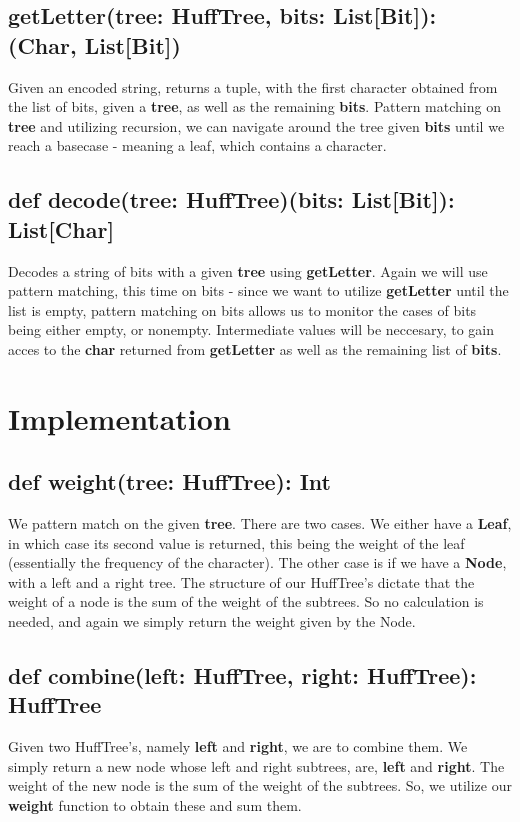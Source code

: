 \documentclass{article}
\begin{document}
\subsection{getLetter(tree: HuffTree, bits: List[Bit]): (Char, List[Bit])}
Given an encoded string, returns a tuple, with the first character obtained from the list of bits, given a \textbf{tree}, as well as the remaining \textbf{bits}. Pattern matching on \textbf{tree} and utilizing recursion, we can navigate around the tree given \textbf{bits} until we reach a basecase - meaning a leaf, which contains a character. 
\subsection{def decode(tree: HuffTree)(bits: List[Bit]): List[Char]}
Decodes a string of bits with a given \textbf{tree} using \textbf{getLetter}. Again we will use pattern matching, this time on bits - since we want to utilize \textbf{getLetter} until the list is empty, pattern matching on bits allows us to monitor the cases of bits being either empty, or nonempty. Intermediate values will be neccesary, to gain acces to the \textbf{char} returned from \textbf{getLetter} as well as the remaining list of \textbf{bits}. 



\section{Implementation}
\subsection{def weight(tree: HuffTree): Int}
We pattern match on the given \textbf{tree}. There are two cases. We either have a \textbf{Leaf}, in which case its second value is returned, this being the weight of the leaf (essentially the frequency of the character). The other case is if we have a \textbf{Node}, with a left and a right tree. The structure of our HuffTree's dictate that the weight of a node is the sum of the weight of the subtrees. So no calculation is needed, and again we simply return the weight given by the Node.

\subsection{def combine(left: HuffTree, right: HuffTree): HuffTree}
Given two HuffTree's, namely \textbf{left} and \textbf{right}, we are to combine them. We simply return a new node whose left and right subtrees, are, \textbf{left} and \textbf{right}. The weight of the new node is the sum of the weight of the subtrees. So, we utilize our \textbf{weight} function to obtain these and sum them.

\end{document}
